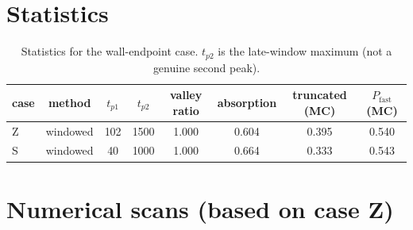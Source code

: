 \documentclass[11pt]{article}
\begin{document}
\section*{Statistics}
\begin{table}[!htbp]
  \centering
  \scriptsize
  \begin{tabular}{lccccccc}
    \toprule
    case & method & $t_{p1}$ & $t_{p2}$ & valley ratio & absorption & truncated (MC) & $P_{\text{fast}}$ (MC) \\
    \midrule
    Z & windowed & 102 & 1500 & 1.000 & 0.604 & 0.395 & 0.540 \\
    S & windowed & 40 & 1000 & 1.000 & 0.664 & 0.333 & 0.543 \\
    \bottomrule
  \end{tabular}
  \caption{Statistics for the wall-endpoint case. $t_{p2}$ is the late-window maximum (not a genuine second peak).}
  \label{tab:metrics}
\end{table}

\section*{Numerical scans (based on case Z)}
\begin{table}[!htbp]
  \centering
  \scriptsize
  \caption{Scan results at $t_{\max}=3000$. For Z0--Z4, $t_{p2}$ is the late-window maximum (not a genuine second peak).}
  \label{tab:scan}
\end{table}
\end{document}
